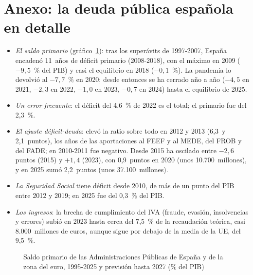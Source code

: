 \documentclass[11pt]{article}
\begin{document}
\section{Anexo: la deuda pública española en detalle}\label{anexo:deuda-espana}

\begin{itemize}
\item \emph{El saldo primario} (gráfico~\ref{fig:saldo-primario-espana}): tras los superávits de 1997-2007, España encadenó 11~años de déficit primario (2008-2018), con el máximo en 2009 ($-9{,}5$~\% del PIB) y casi el equilibrio en 2018 ($-0{,}1$~\%). La pandemia lo devolvió al $-7{,}7$~\% en 2020; desde entonces se ha cerrado año a año ($-4{,}5$ en 2021, $-2{,}3$ en 2022, $-1{,}0$ en 2023, $-0{,}7$ en 2024) hasta el equilibrio de 2025\nocite{Eurostat2026EDP}.
\item \emph{Un error frecuente}: el déficit del 4,6~\% de 2022 es el total; el primario fue del 2,3~\%\nocite{Eurostat2026EDP}.
\item \emph{El ajuste déficit-deuda}: elevó la ratio sobre todo en 2012 y 2013 (6,3~y 2,1~puntos), los años de las aportaciones al FEEF y al MEDE, del FROB y del FADE\nocite{Eurostat2026EDP,EstevePrats2023Cambios}; en 2010-2011 fue negativo. Desde 2015 ha oscilado entre $-2{,}6$ puntos (2015) y $+1{,}4$ (2023), con 0,9~puntos en 2020 (unos 10.700~millones), y en 2025 sumó 2,2~puntos (unos 37.100~millones)\nocite{Eurostat2026EDP}.
\item \emph{La Seguridad Social} tiene déficit desde 2010, de más de un punto del PIB entre 2012 y 2019; en 2025 fue del 0,3~\% del PIB\nocite{Eurostat2026GovMain,Hacienda2026Deficit2025}.
\item \emph{Los ingresos}: la brecha de cumplimiento del IVA (fraude, evasión, insolvencias y errores) subió en 2023 hasta cerca del 7,5~\% de la recaudación teórica, casi 8.000~millones de euros, aunque sigue por debajo de la media de la UE, del 9,5~\%\nocite{CE2025MindTheGapES}.
\end{itemize}

\begin{figure}[H]
\centering
\caption{Saldo primario de las Administraciones Públicas de España y de la zona del euro, 1995-2025 y previsión hasta 2027 (\% del PIB)}\label{fig:saldo-primario-espana}
\end{figure}
\end{document}
